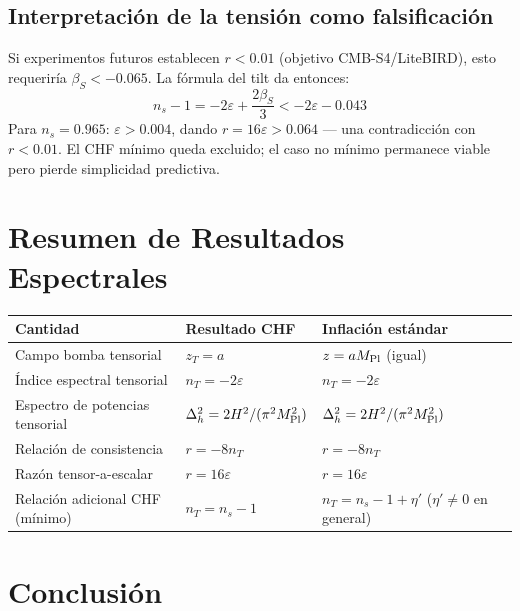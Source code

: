 \documentclass[12pt,a4paper]{article}
\begin{document}
\subsection{Interpretación de la tensión como falsificación}

Si experimentos futuros establecen $r < 0.01$ (objetivo CMB-S4/LiteBIRD), esto requeriría $\beta_S < -0.065$. La fórmula del tilt da entonces:
\begin{equation}
n_s - 1 = -2\varepsilon + \frac{2\beta_S}{3} < -2\varepsilon - 0.043 \tag{26}
\end{equation}
Para $n_s = 0.965$: $\varepsilon > 0.004$, dando $r = 16\varepsilon > 0.064$ --- una contradicción con $r < 0.01$. El CHF mínimo queda excluido; el caso no mínimo permanece viable pero pierde simplicidad predictiva.

\section{Resumen de Resultados Espectrales}

\begin{table}[h]
\centering
\small
\begin{tabular}{lll}
\toprule
Cantidad & Resultado CHF & Inflación estándar \\
\midrule
Campo bomba tensorial & $z_T = a$ & $z = aM_{\rm Pl}$ (igual) \\
Índice espectral tensorial & $n_T = -2\varepsilon$ & $n_T = -2\varepsilon$ \\
Espectro de potencias tensorial & $\Delta_h^2 = 2H^2/(\pi^2 M_{\rm Pl}^2)$ & $\Delta_h^2 = 2H^2/(\pi^2 M_{\rm Pl}^2)$ \\
Relación de consistencia & $r = -8n_T$ & $r = -8n_T$ \\
Razón tensor-a-escalar & $r = 16\varepsilon$ & $r = 16\varepsilon$ \\
Relación adicional CHF (mínimo) & $n_T = n_s - 1$ & $n_T = n_s - 1 + \eta'$ ($\eta' \neq 0$ en general) \\
\bottomrule
\end{tabular}
\end{table}

\section{Conclusión}
\end{document}
